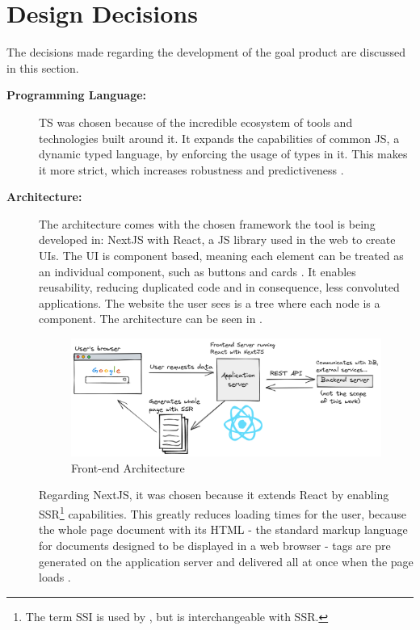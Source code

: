 \section{Design Decisions}\label{ext:design-decisions}

The decisions made regarding the development of the goal product are discussed in this section.

\begin{description}
  \item[\textbf{Programming Language:}] \ac{TS} was chosen because of the incredible ecosystem of tools and technologies built around it. It expands the capabilities of common \ac{JS}, a dynamic typed language, by enforcing the usage of types in it. This makes it more strict, which increases robustness and predictiveness \cite{Bierman_2014}.
  \item[\textbf{Architecture:}] The architecture comes with the chosen framework the tool is being developed in: NextJS with React, a \ac{JS} library used in the web to create \aclp{UI}. The \ac{UI} is component based, meaning each element can be treated as an individual component, such as buttons and cards \cite{facebook_2022}. It enables reusability, reducing duplicated code and in consequence, less convoluted applications. The website the user sees is a tree where each node is a component. The architecture can be seen in .

    \begin{figure}[!htb]
      \caption{Front-end Architecture}\label{fig:arch}
      \begin{center}
        \includegraphics[width=14cm]{img/6-architecture.png}
      \end{center}
    \end{figure}

    Regarding NextJS, it was chosen because it extends React by enabling \ac{SSR}\footnote{The term \ac{SSI} is used by \textcite{DBLP:journals/corr/abs-0801-2618}, but is interchangeable with \acl{SSR}.} capabilities. This greatly reduces loading times for the user, because the whole page document with its \ac{HTML} - the standard markup language for documents designed to be displayed in a web browser \cite{patel2013incremental} - tags are pre generated on the application server and delivered all at once when the page loads \cite{DBLP:journals/corr/abs-0801-2618}.


\end{description}
